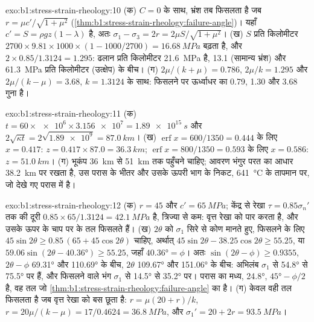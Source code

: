 \begin{solution}{exo:b1:stress-strain-rheology:10}
(क) $C = 0$ के साथ, भ्रंश तब फिसलता है जब $r = \mu c'/\sqrt{1+\mu^2}$
(\cref{thm:b1:stress-strain-rheology:failure-angle})। यहाँ $c' = S =
\rho g z(1-\lambda)$ है, अतः $\sigma_1 - \sigma_3 = 2r = 2\mu S/\sqrt{1+\mu^2}$।
(ख) $S$ प्रति किलोमीटर $2700\times9.81\times1000\times(1 - 1000/2700) =
\qty{16.68}{MPa}$ बढ़ता है, और $2\times0.85/1.3124 = 1.295$: ढलान
प्रति किलोमीटर \qty{21.6}{MPa} है, \num{13.1} (सामान्य भ्रंश) और
\qty{61.3}{MPa} प्रति किलोमीटर (उत्क्षेप) के बीच। (ग) $2\mu/(k+\mu) = 0.786$,
$2\mu/k = 1.295$ और $2\mu/(k-\mu) = 3.68$, $k = 1.3124$ के साथ: फिसलने पर 
ऊर्ध्वाधर  का 0.79, 1.30 और 3.68 गुना है।
\end{solution}

\begin{solution}{exo:b1:stress-strain-rheology:11}
(क) $t = 60\times\num{e6}\times\num{3.156e7} = \qty{1.89e15}{s}$ और
$2\sqrt{\kappa t} = 2\sqrt{\num{1.89e9}} = \qty{87.0}{km}$। (ख)
$\operatorname{erf}x = 600/1350 = 0.444$ के लिए $x = 0.417$: $z = 0.417\times87.0
= \qty{36.3}{km}$; $\operatorname{erf}x = 800/1350 = 0.593$ के लिए $x = 0.586$:
$z = \qty{51.0}{km}$। (ग) भूकंप \qty{36}{km} से \qty{51}{km} तक पहुँचने चाहिए;
आवरण भंगुर परत का आधार \qty{38.2}{km} पर रखता है, उस परास के भीतर और उसके ऊपरी भाग के निकट, \qty{641}{\degreeCelsius} के तापमान पर, जो देखे गए परास में है।
\end{solution}

\begin{solution}{exo:b1:stress-strain-rheology:12}
(क) $r = 45$ और $c' = \qty{65}{MPa}$; केंद्र से रेखा $\tau = 0.85\sigma_n'$ तक की दूरी $0.85\times65/1.3124 = \qty{42.1}{MPa}$ है, त्रिज्या से कम:
वृत्त रेखा को पार करता है, और उसके ऊपर के चाप पर के तल फिसलते हैं। (ख) $2\theta$ को $\sigma_1$ सिरे से कोण मानते हुए, फिसलने के लिए $45\sin2\theta \ge 0.85\,(65 + 45\cos2\theta)$ चाहिए, अर्थात्
$45\sin2\theta - 38.25\cos2\theta \ge 55.25$, या
$59.06\sin(2\theta - \ang{40.36}) \ge 55.25$, जहाँ $\ang{40.36} = \phi$।
अतः $\sin(2\theta - \phi) \ge 0.9355$, $2\theta - \phi$ \ang{69.31} और
\ang{110.69} के बीच, $2\theta$ \ang{109.67} और \ang{151.06} के बीच: अभिलंब
$\sigma_1$ से \ang{54.8} से \ang{75.5} पर हैं, और फिसलने वाले भंग
$\sigma_1$ से \ang{14.5} से \ang{35.2} पर। परास का मध्य,
\ang{24.8}, $\ang{45} - \phi/2$ है, वह तल जो
\cref{thm:b1:stress-strain-rheology:failure-angle} का है। (ग) केवल वही तल फिसलता है जब वृत्त रेखा को बस छूता है:
$r = \mu(20 + r)/k$, $r = 20\mu/(k -
\mu) = 17/0.4624 = \qty{36.8}{MPa}$, और $\sigma_1' = 20 + 2r =
\qty{93.5}{MPa}$।
\end{solution}

